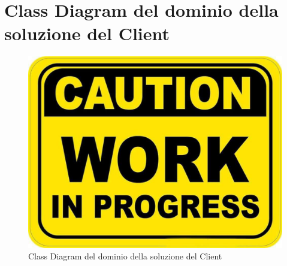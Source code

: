     \section{Class Diagram del dominio della soluzione del Client}
        \begin{figure}[htbp!]
            \centering
                \vspace{2\baselineskip}
                \includegraphics[width=\linewidth]{Immagini/WorkInProgress.pdf}
            \caption{Class Diagram del dominio della soluzione del Client}
            \label{fig:Class Diagram del dominio della soluzione del Client}
        \end{figure}